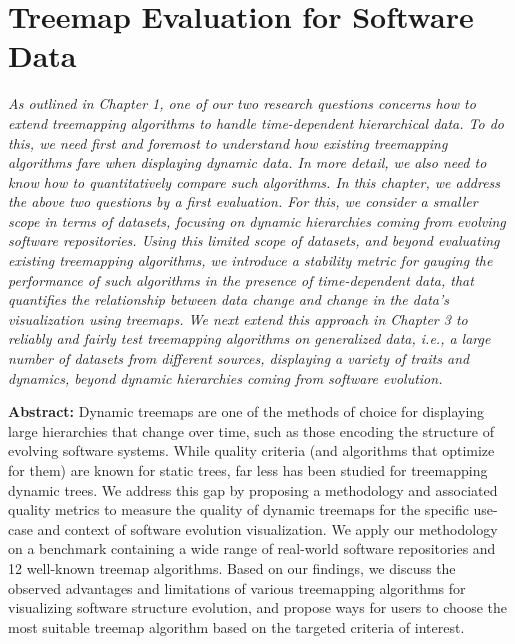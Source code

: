\chapter{Treemap Evaluation for Software Data}
\label{ch:soft-eval}

\textit{
As outlined in Chapter 1, one of our two research questions concerns how to extend treemapping algorithms to handle time-dependent hierarchical data. To do this, we need first and foremost to understand how existing treemapping algorithms fare when displaying dynamic data. In more detail, we also need to know how to quantitatively compare such algorithms. In this chapter, we address the above two questions by a first evaluation. For this, we consider a smaller scope in terms of datasets, focusing on dynamic hierarchies coming from evolving software repositories. Using this limited scope of datasets, and beyond evaluating existing treemapping algorithms, we introduce a stability metric for gauging the performance of such algorithms in the presence of time-dependent data, that quantifies the relationship between data change and change in the data's visualization using treemaps. We next extend this approach in Chapter 3 to reliably and fairly test treemapping algorithms on generalized data, \emph{i.e.}, a large number of datasets from different sources, displaying a variety of traits and dynamics, beyond dynamic hierarchies coming from software evolution.}


\vspace{5mm} %

\noindent \textbf{Abstract:}
Dynamic treemaps are one of the methods of choice for displaying large hierarchies that change over time, such as those encoding the structure of evolving software systems. While quality criteria (and algorithms that optimize for them) are known for static trees, far less has been studied for treemapping dynamic trees. We address this gap by proposing a methodology and associated quality metrics to measure the quality of dynamic treemaps for the specific use-case and context of software evolution visualization. We apply our methodology on a benchmark containing a wide range of real-world software repositories and 12 well-known treemap algorithms. Based on our findings, we discuss the observed advantages and limitations of various treemapping algorithms for visualizing software structure evolution, and propose ways for users to choose the most suitable treemap algorithm based on the targeted criteria of interest.

